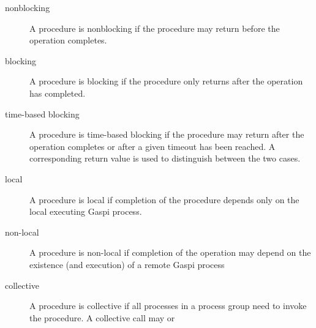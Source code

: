 \documentclass{article}
\newlength{\st}\setlength{\st}{0pt}
\newcommand{\GASPI}{{\sc Gaspi}}
\begin{document}
\begin{description}
\item[nonblocking] A procedure is nonblocking if the procedure may
  return before the operation completes.
\begin{center}
\end{center}
\item[blocking] A procedure is blocking if the procedure only returns
  after the operation has completed.
\begin{center}
\end{center}
\item[time-based blocking] A procedure is time-based blocking if the
  procedure may return after the operation completes or after a given
  timeout has been reached.  A corresponding return value is used to distinguish between the two cases.
\begin{center}
\end{center}
\item[local] A procedure is local if completion of the procedure depends
  only on the local executing \GASPI{} process.
\item[non-local] A procedure is non-local if completion of the
  operation may depend on the existence (and execution) of a remote \GASPI{} process
\item[collective] A procedure is collective if all processes in a
  process group need to invoke the procedure. A collective call may or

\end{description}
\end{document}
